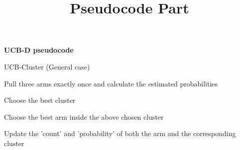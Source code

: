 \documentclass{article}
\title{Pseudocode Part}
\begin{document}
 

\maketitle

\textbf{UCB-D pseudocode }



\begin{minipage}{15cm}
    \begin{algorithm}[H]
        \caption{UCB-Cluster (General case)}
        \begin{algorithmic}[1]
                \State Pull three arms exactly once and calculate the estimated probabilities
            \EndFor
                

                \State Choose the best cluster

                \State Choose the best arm inside the above chosen cluster

                \State Update the 'count' and 'probability' of both the arm and the corresponding cluster
            \EndFor

        \end{algorithmic}
    \end{algorithm}
\end{minipage}
\end{document}
